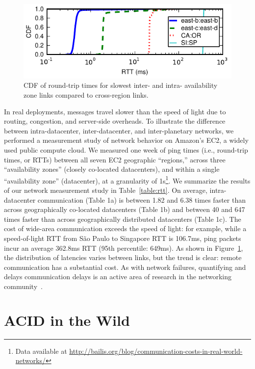 \begin{figure}[t!]
\includegraphics[width=\columnwidth]{figs/ping-plot.pdf}\vspace{-1em}
\caption{CDF of round-trip times for slowest inter- and intra-
  availability zone links compared to cross-region links.}\vspace{-1em}
\label{fig:rtt}
\end{figure}

In real deployments, messages travel slower than the speed of light
due to routing, congestion, and server-side overheads. To illustrate
the difference between intra-datacenter, inter-datacenter, and
inter-planetary networks, we performed a measurement study of network
behavior on Amazon's EC2, a widely used public compute cloud. We
measured one week of ping times (i.e., round-trip times, or RTTs)
between all seven EC2 geographic ``regions,'' across three
``availability zones'' (closely co-located datacenters), and within a
single ``availability zone'' (datacenter), at a granularity of
1s\footnote{Data available at \url{http://bailis.org/blog/communication-costs-in-real-world-networks/}}. We
summarize the results of our network measurement study in
Table~\ref{table:rtt}. On average, intra-datacenter communication
(Table 1a) is between 1.82 and 6.38 times faster than across
geographically co-located datacenters (Table 1b) and between 40 and
647 times faster than across geographically distributed datacenters
(Table 1c). The cost of wide-area communication exceeds the speed of
light: for example, while a speed-of-light RTT from S\~{a}o Paulo to
Singapore RTT is 106.7ms, ping packets incur an average 362.8ms RTT
(95th percentile: 649ms). As shown in Figure~\ref{fig:rtt}, the
distribution of latencies varies between links, but the trend is
clear: remote communication has a substantial cost. As with network
failures, quantifying and delays communication delays is an active
area of research in the networking community~\cite{bobtail}.

\section{ACID in the Wild}
\label{sec:modernacid}

